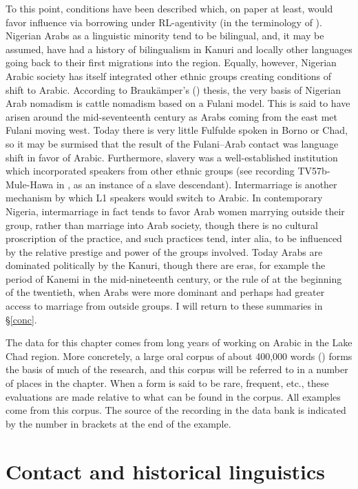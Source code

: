 \documentclass[output=paper]{langsci/langscibook}
\begin{document}
To this point, conditions have been described which, on paper at least, would favor influence via borrowing under RL-agentivity (in the terminology of \citealt{VanCoetsem1988,VanCoetsem2000}). Nigerian Arabs as a linguistic minority tend to be bilingual, and, it may be assumed, have had a history of bilingualism in Kanuri and locally other languages going back to their first migrations into the region. Equally, however, Nigerian Arabic society has itself integrated other ethnic groups creating conditions of shift to Arabic. According to Braukämper’s (\citeyear{Braukämper1994}) thesis, the very basis of Nigerian Arab nomadism is cattle nomadism based on a Fulani model. This is said to have arisen around the mid-seventeenth century as Arabs coming from the east met Fulani moving west. Today there is very little Fulfulde spoken in Borno or Chad, so it may be surmised that the result of the Fulani--Arab contact was language shift in favor of Arabic. Furthermore, slavery was a well-established institution which incorporated speakers from other ethnic groups (see recording TV57b-Mule-Hawa in \citealt{OwensHassan2011}, as an instance of a slave descendant). Intermarriage is another mechanism by which L1 speakers would switch to Arabic. In contemporary Nigeria, intermarriage in fact tends to favor Arab women marrying outside their group, rather than marriage into Arab society, though there is no cultural proscription of the practice, and such practices tend, inter alia, to be influenced by the relative prestige and power of the groups involved. Today Arabs are dominated politically by the Kanuri, though there are eras, for example the period of Kanemi in the mid-nineteenth century, or the rule of  at the beginning of the twentieth, when Arabs were more dominant and perhaps had greater access to marriage from outside groups. I will return to these summaries in §\ref{conc}.

The data for this chapter comes from long years of working on Arabic in the Lake Chad region. More concretely, a large oral corpus of about 400,000 words (\citealt{OwensHassan2011}) forms the basis of much of the research, and this corpus will be referred to in a number of places in the chapter. When a form is said to be rare, frequent, etc., these evaluations are made relative to what can be found in the corpus. All examples come from this corpus. The source of the recording in the data bank is indicated by the number in brackets at the end of the example.

\section{Contact and historical linguistics
}
\end{document}

